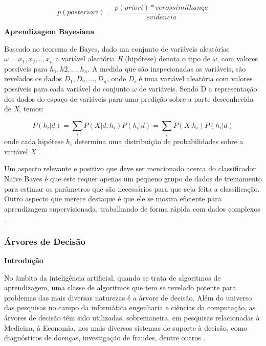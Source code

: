 \begin{equation}
p(posteriori) = \frac{p(priori) * verossimilhança}{evidencia}
\end{equation}

\vspace{5mm}

\textbf{Aprendizagem Bayesiana}
\vspace{5mm}

Baseado no teorema de Bayes, dado um conjunto de variáveis aleatórias $\omega = {x_{1}, x_{2},..,x_{n}}$ a variável aleatória \textit{H} (hipótese) denota o tipo de $\omega$, com valores possíveis para $h_{1}, h{2},...,h_{n}$. A medida que são inspecionadas as variáveis, são revelados os dados $D_{1}, D_{2},...,D_{n}$, onde $D_{i}$ é uma variável aleatória com valores possíveis para cada variável do conjunto $\omega$ de variáveis. Sendo D a representação dos dados do espaço de variáveis para uma predição sobre a parte desconhecida de \textit{X}, temos:

\begin{equation}
P(h_{i}|d) = \sum_{i}P(X|d,h_{i})P(h_{i}|d) = \sum_{i}P(X|h_{i})P(h_{i}|d)
\end{equation}
 onde cada hipótese $h_{i}$ determina uma distribuição de probabilidades sobre a variável \textit{X} \cite{NorvigRussel2004}.

Um aspecto relevante e positivo que deve ser mencionado acerca do classificador Naïve Bayes é que este requer apenas um pequeno grupo de dados de treinamento para estimar os parâmetros que são necessários para que seja feita a classificação. Outro aspecto que merece destaque é que ele se mostra eficiente para aprendizagem supervisionada, trabalhando de forma rápida com dados complexos \cite{policarpo2015semantic}.


\subsubsection{Árvores de Decisão}

\textbf{Introdução}
\vspace{5mm}

No âmbito da inteligência artificial, quando se trata de algoritmos de aprendizagem, uma classe de algoritmos que tem se revelado potente para problemas das mais diversas naturezas é a árvore de decisão. Além do universo das pesquisas no campo da informática engenharia e ciências da computação, as árvores de decisão têm sido utilizadas, sobremaneira, em pesquisas relacionadas à Medicina, à Economia, nos mais diversos sistemas de suporte à decisão, como diagnósticos de doenças, investigação de fraudes, dentre outros \cite{Camilo}.

